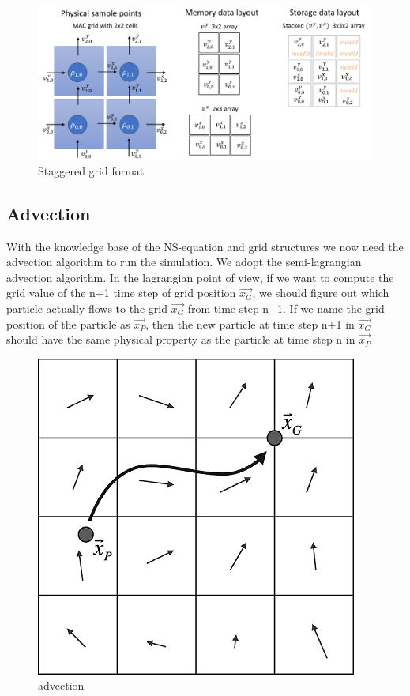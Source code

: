\documentclass[a4paper,12pt,twoside]{report}
\begin{document}
\begin{figure}[h]
\centering
\includegraphics[width=\textwidth]{Staggered.png}
\caption{Staggered grid format}
\end{figure}

\subsection{Advection}
With the knowledge base of the NS-equation and grid structures we now need the advection algorithm to run the simulation. We adopt the semi-lagrangian advection algorithm. In the lagrangian point of view, if we want to compute the grid value of the n+1 time step of grid position $\vec{x_G}$, we should figure out which particle actually flows to the grid $\vec{x_G}$ from time step n+1. If we name the grid position of the particle as $\vec{x_P}$, then the new particle at time step n+1 in $\vec{x_G}$ should have the same physical property as the particle at time step n in $\vec{x_P}$

\begin{figure}[h]
\centering
\includegraphics[scale=0.5]{advection.png}
\caption{advection}
\end{figure}
\end{document}
